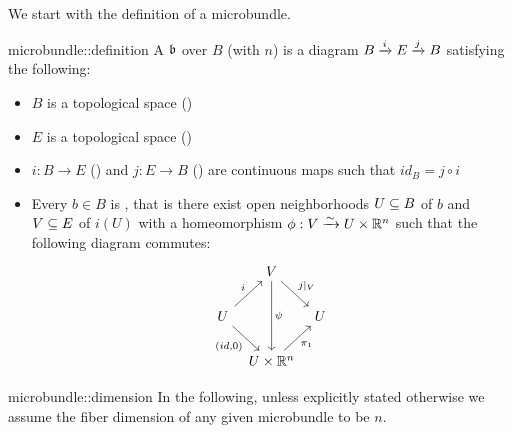 \begin{myparagraph}
    We start with the definition of a microbundle.
\end{myparagraph}

\begin{mydefinition}[microbundle]{microbundle::definition}
    A  $\bb$ over $B$ (with  $n$) is a diagram $\bundle{B}{E}{i}{j}$ satisfying the following:
    \begin{itemize}
        \item $B$ is a topological space ()
        \item $E$ is a topological space ()
        \item $i: B \to E$ () and $j: E \to B$ () are continuous maps such that $id_B = j \circ i$
        \item Every $b \in B$ is , that is there exist open neighborhoods $U \sub B$ of $b$ and $V \sub E$ of $i(U)$ with a homeomorphism $\phi: V \isomto U \times \R^n$ such that the following diagram commutes:
        \[
            \begin{tikzcd}[column sep=tiny]
                & V \ar[dr, "j\vert_V"] \ar[dd, "\psi"] & \\
                U \ar[ur, "i"] \ar[dr, "{(id, 0)}"'] & & U \\
                & U \times\R^n \ar[ur, "\pi_1"'] &
            \end{tikzcd}
        \]
    \end{itemize}
\end{mydefinition}

\begin{myremark}{microbundle::dimension}
    In the following, unless explicitly stated otherwise we assume the fiber dimension of any given microbundle to be $n$.
\end{myremark}